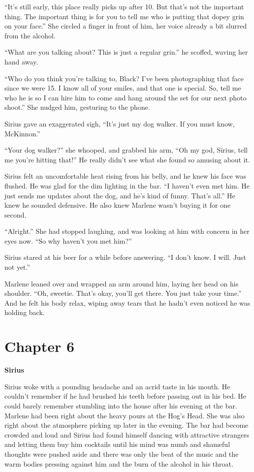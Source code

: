 \documentclass[12pt,twoside,openright]{memoir}
\begin{document}
``It's still early, this place really picks up after 10. But that's not the important thing. The important thing is for you to tell me who is putting that dopey grin on your face.'' She circled a finger in front of him, her voice already a bit slurred from the alcohol.

``What are you talking about? This is just a regular grin.'' he scoffed, waving her hand away. 

``Who do you think you're talking to, Black? I've been photographing that face since we were 15. I know all of your smiles, and that one is special. So, tell me who he is so I can hire him to come and hang around the set for our next photo shoot.'' She nudged him, gesturing to the phone.

Sirius gave an exaggerated sigh, ``It's just my dog walker. If you must know, McKinnon.''

``Your dog walker?'' she whooped, and grabbed his arm, ``Oh my god, Sirius, tell me you're hitting that!'' He really didn't see what she found so amusing about it.

Sirius felt an uncomfortable heat rising from his belly, and he knew his face was flushed. He was glad for the dim lighting in the bar. ``I haven't even met him. He just sends me updates about the dog, and he's kind of funny. That's all.'' He knew he sounded defensive. He also knew Marlene wasn't buying it for one second. 

``Alright.'' She had stopped laughing, and was looking at him with concern in her eyes now. ``So why haven't you met him?''

Sirius stared at his beer for a while before answering. ``I don't know. I will. Just not yet.''

Marlene leaned over and wrapped an arm around him, laying her head on his shoulder. ``Oh, sweetie. That's okay, you'll get there. You just take your time.'' And he felt his body relax, wiping away tears that he hadn't even noticed he was holding back.

\chapter*{Chapter 6}

\textbf{Sirius} 

Sirius woke with a pounding headache and an acrid taste in his mouth. He couldn't remember if he had brushed his teeth before passing out in his bed. He could barely remember stumbling into the house after his evening at the bar. Marlene had been right about the heavy pours at the Hog's Head. She was also right about the atmosphere picking up later in the evening. The bar had become crowded and loud and Sirius had found himself dancing with attractive strangers and letting them buy him cocktails until his mind was numb and shameful thoughts were pushed aside and there was only the beat of the music and the warm bodies pressing against him and the burn of the alcohol in his throat.
\end{document}
